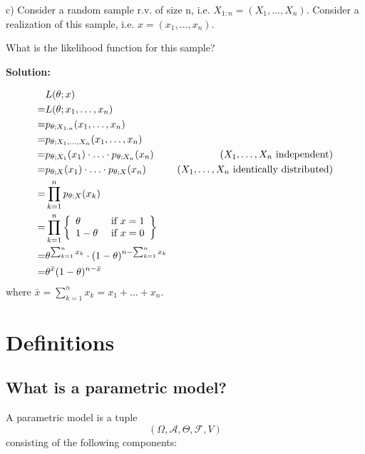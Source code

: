 \documentclass{article}
\begin{document}
\begin{ssubproblem}
c)
Consider a random sample r.v. of size n, i.e. \(X_{1:n}=(X_1, \ldots, X_n)\).
Consider a realization of this sample, i.e. \(x=(x_1, \ldots, x_n)\).

What is the likelihood function for this sample?
\end{ssubproblem}

\textbf{Solution:}
\begin{ssolution}

\begin{align*}
     & L(\theta;x) \\
    =& L(\theta;x_1,\ldots,x_n) \\
    =& p_{\theta;X_{1:n}}(x_1,\ldots,x_n) \\
    =& p_{\theta;X_1,\ldots,X_n}(x_1,\ldots,x_n) \\
    =& p_{\theta;X_1}(x_1)\cdot \ldots \cdot p_{\theta;X_n}(x_n) & (X_1,\ldots,X_n\text{ independent}) \\
    =& p_{\theta;X}(x_1)\cdot \ldots \cdot p_{\theta;X}(x_n) & (X_1,\ldots,X_n\text{ identically distributed}) \\
    =& \prod_{k=1}^n p_{\theta;X}(x_k) \\
    =& \prod_{k=1}^n \left\{\begin{array}{lr}\theta & \text{ if }x=1\\1-\theta & \text{ if }x=0\end{array}\right\} \\
    =& \theta^{\sum_{k=1}^n x_k}\cdot (1-\theta)^{n-\sum_{k=1}^n x_k} \\
    =& \theta^{\bar{x}} (1-\theta)^{n-\bar{x}}
\end{align*}
where \(\bar{x}=\sum_{k=1}^n x_k=x_1+\ldots+x_n\).
\end{ssolution}

\section{Definitions}
\subsection{What is a parametric model?}

A parametric model is a tuple
\[(\Omega, \mathcal{A}, \Theta, \mathcal{F},V)\]
consisting of the following components:
\end{document}
